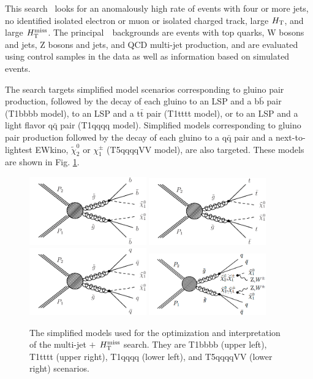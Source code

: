 
This search~\cite{Khachatryan:2016kdk} looks for an anomalously high rate of events
with four or more jets,
no identified isolated electron or muon
or isolated charged track,
large $H_{\rm T}$, and large $H_{\text{T}}^{\rm miss}$.
The principal~\sm~backgrounds are
 events with top quarks,
W bosons and jets,
Z bosons and jets,
and QCD multi-jet production,
and are evaluated using control samples in the data as well 
as information based on simulated events.

The search targets simplified model scenarios corresponding to  
gluino pair production,
followed by the decay of each gluino to an LSP
and a b$\bar{\text{b}}$ pair (T1bbbb model),
to an LSP and a 
t$\bar{\text{t}}$ pair  (T1tttt model),
or to an LSP and  a light flavor q$\bar{\text{q}}$ pair (T1qqqq model).
Simplified models corresponding to gluino pair
production followed by the decay of each gluino to
a q$\bar{\text{q}}$ pair and
a next-to-lightest EWkino, $\tilde{\chi}^{0}_{2}$ or $\chi^{\pm}_{1}$ (T5qqqqVV model), 
are also targeted.
These models are shown in 
Fig. \ref{fig:Ra2bSMS}.
\begin{figure}[tb!]
\centering
\includegraphics[width=0.45\textwidth]{figures/SusySearches/Ra2b2015/T1bbbb.pdf}
\includegraphics[width=0.45\textwidth]{figures/SusySearches/Ra2b2015/T1tttt.pdf}\\
\includegraphics[width=0.45\textwidth]{figures/SusySearches/Ra2b2015/T1qqqq.pdf}
\includegraphics[width=0.45\textwidth]{figures/SusySearches/Ra2b2015/T5vv.pdf}
\caption{
  The simplified models used for the optimization and interpretation of the multi-jet $+$ $H_{\text{T}}^{\rm miss}$ search. 
  They are T1bbbb (upper left), T1tttt (upper right), T1qqqq (lower left), and T5qqqqVV (lower right) scenarios.
}
\label{fig:Ra2bSMS}
\end{figure}

